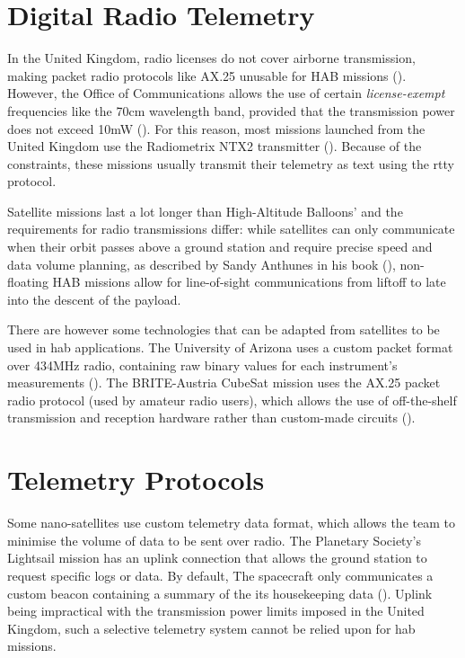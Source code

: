 \section{Digital Radio Telemetry}

In the United Kingdom, radio licenses do not cover airborne transmission, making
packet radio protocols like AX.25 unusable for HAB missions 
(\cite{ukhasradio2016}). However, the Office of Communications allows the use
of certain \textit{license-exempt} frequencies like the 70cm wavelength band,
provided that the transmission power does not exceed 10mW (\cite{Ofcom2014}).
For this reason, most missions launched from the United Kingdom use the
Radiometrix NTX2 transmitter (\cite{radiometrix2012}). Because of the
constraints, these missions usually transmit their telemetry as text using the
\acrfull{rtty} protocol.

Satellite missions last a lot longer than High-Altitude Balloons' and the
requirements for radio transmissions differ: while satellites can only
communicate when their orbit passes above a ground station and require precise
speed and data volume planning, as described by Sandy Anthunes in his book
(\cite{Antunes2015}), non-floating HAB missions allow for line-of-sight
communications from liftoff to late into the descent of the payload.

There are however some technologies that can be adapted from satellites to be
used in \acrshort{hab} applications. The University of Arizona uses a custom
packet format over 434MHz radio, containing raw binary values for each
instrument's measurements (\cite{Eatchel2002}). The BRITE-Austria CubeSat
mission uses the AX.25 packet radio protocol (used by amateur radio users),
which allows the use of off-the-shelf transmission and reception hardware
rather than custom-made circuits (\cite{Traussnig2007}).

\section{Telemetry Protocols}

Some nano-satellites use custom telemetry data format, which allows the team
to minimise the volume of data to be sent over radio. The Planetary Society's
Lightsail mission has an uplink connection that allows the ground station
to request specific logs or data. By default, The spacecraft only communicates
a custom beacon containing a summary of the its housekeeping data
(\cite{planetary2016}). Uplink being impractical with the transmission power
limits imposed in the United Kingdom, such a selective telemetry system cannot
be relied upon for \acrshort{hab} missions.

